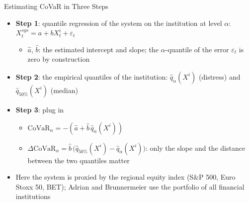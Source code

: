 \begin{frame}{Estimating CoVaR in Three Steps}
\itemsize{\small}
\begin{itemize}
    \item \textbf{Step 1}: quantile regression of the system on the institution at level $\alpha$: $X^{sys}_t = a + bX^i_t + \varepsilon_t$ 
    \begin{itemize}
        \item $\hat a$, $\hat b$: the estimated intercept and slope; the $\alpha$-quantile of the error $\varepsilon_t$ is zero by construction
    \end{itemize}
    \item \textbf{Step 2}: the empirical quantiles of the institution: $\hat q_\alpha(X^i)$ (distress) and $\hat q_{50\%}(X^i)$ (median)
    \item \textbf{Step 3}: plug in
    \begin{itemize}
        \item $\mathrm{CoVaR}_\alpha = -(\hat a + \hat b\,\hat q_\alpha(X^i))$
        \item $\Delta\mathrm{CoVaR}_\alpha = \hat b\,\big(\hat q_{50\%}(X^i) - \hat q_\alpha(X^i)\big)$: only the slope and the distance between the two quantiles matter
    \end{itemize}
    \item Here the system is proxied by the regional equity index (S\&P 500, Euro Stoxx 50, BET); Adrian and Brunnermeier use the portfolio of all financial institutions
\end{itemize}
\end{frame}

